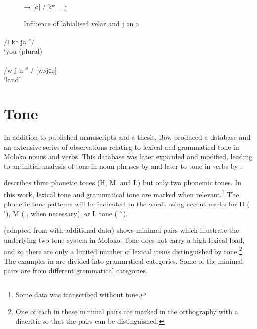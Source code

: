 \begin{figure}
\begin{centering}[ə] →  [ø] /   kʷ \_ j\end{centering}
\caption{Influence of labialised velar and j on ə\label{fig:2.7}}
\end{figure}

\ea \label{ex:2:46}
\textup{/l kʷ ja \textsuperscript{e}}\textup{/  \ExampleSpace  [lʊkʷøjɛ]}\\
\glt  ‘you (plural)’
\z

\ea \label{ex:2:47}
\textup{/w j n \textsuperscript{e}}\textup{ /  \ExampleSpace \hspace{2pt}  [wøjɛŋ}\textup{]}\\
\glt  ‘land’
\z

\section{Tone}\label{sec:2.4}
\hypertarget{RefHeading1210621525720847}{}
In addition to published manuscripts and a thesis, Bow produced a database and an extensive series of observations relating to lexical and grammatical tone in Moloko nouns and verbs.  This database was later expanded and modified, leading to an initial analysis of tone in noun phrases by \citet{Boyd2002} and later to tone in verbs by \citet{FriesenMamalis2008}.  

\citet{Bow1997c} describes three phonetic tones (H, M, and L) but only two phonemic tones. In this work, lexical tone and grammatical tone are marked when relevant.\footnote{Some data was transcribed without tone.}  The phonetic tone patterns will be indicated on the words using accent marks for H (  \'{ }), M (  \={ }, when necessary), or L tone (  \`{ }).  

 (adapted from \citealt{Bow1997c} with additional data) shows minimal pairs which illustrate the underlying two tone system in Moloko. Tone does not carry a high lexical load, and so there are only a limited number of lexical items distinguished by tone.\footnote{One of each in these minimal pairs are marked in the orthography with a diacritic so that the pairs can be distinguished. } The examples in  are divided into grammatical categories. Some of the minimal pairs are from different grammatical categories. 

